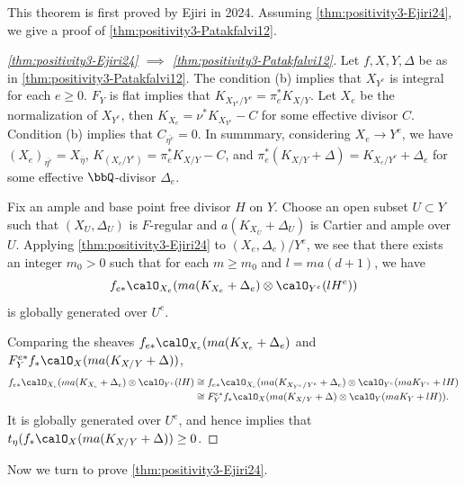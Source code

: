 This theorem is first proved by Ejiri in 2024.
Assuming \cref{thm:positivity3-Ejiri24}, we give a proof of \cref{thm:positivity3-Patakfalvi12}.

\begin{proof}[\cref{thm:positivity3-Ejiri24} $\implies$ \cref{thm:positivity3-Patakfalvi12}]
	Let $f,X,Y,\Delta$ be as in \cref{thm:positivity3-Patakfalvi12}.
	The condition (b) implies that $X_{Y^e}$ is integral for each $e \geq 0$.
	$F_Y$ is flat implies that $K_{X_{Y^e}/Y^e} = \pi_e^* K_{X/Y}$.
	Let $X_e$ be the normalization of $X_{Y^e}$, then $K_{X_e} = \nu^* K_{X_{Y^e}} - C$ for some effective divisor $C$.
	Condition (b) implies that $C_{\overline{\eta^e}} = 0$.
	In summmary, considering $X_e \to Y^e$, we have $(X_e)_{\overline{\eta^e}} = X_{\overline{\eta}}$, $K_{(X_e/Y^e)} = \pi_e^* K_{X/Y} - C$, and $\pi_e^* (K_{X/Y} + \Delta) = K_{X_e/Y^e} + \Delta_e$ for some effective $\bbQ$-divisor $\Delta_e$.

	Fix an ample and base point free divisor $H$ on $Y$.
	Choose an open subset $U \subset Y$ such that $(X_U, \Delta_U)$ is $F$-regular and $a(K_{X_U} + \Delta_U)$ is Cartier and ample over $U$.
	Applying \cref{thm:positivity3-Ejiri24} to $(X_e, \Delta_e)/Y^e$, we see that there exists an integer $m_0 > 0$ such that for each $m \geq m_0$ and $l = ma(d + 1)$, we have
	\[ f_{e*} \calO_{X_e}(ma(K_{X_e} + \Delta_e) \otimes \calO_{Y^e}(lH^e)) \]
	is globally generated over $U^e$.

	Comparing the sheaves $f_{e*} \calO_{X_e}(ma(K_{X_e} + \Delta_e)$ and $F_Y^{e*} f_* \calO_X(ma(K_{X/Y} + \Delta))$,
	\begin{align*}
		f_{e*} \calO_{X_e}(ma(K_{X_e} + \Delta_e) \otimes \calO_{Y^e}(lH) & \cong f_{e*} \calO_{X_e}(ma(K_{X_{Y^e}/Y^e} + \Delta_e) \otimes \calO_{Y^e}(maK_{Y^e} + lH) \\
		                                                                  & \cong F_Y^{e*} f_* \calO_X(ma(K_{X/Y} + \Delta) \otimes \calO_Y(maK_Y + lH)).
	\end{align*}
	It is globally generated over $U^e$, and hence implies that $t_\eta (f_* \calO_X(ma(K_{X/Y} + \Delta)) \geq 0$.
\end{proof}

Now we turn to prove \cref{thm:positivity3-Ejiri24}.

